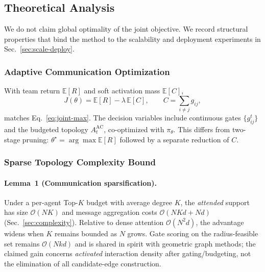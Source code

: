 
\subsection{Theoretical Analysis}
\label{sec:theory}

We do not claim global optimality of the joint objective.
We record structural properties that bind the method to the
scalability and deployment experiments in Sec.~\ref{sec:scale-deploy}.

\subsubsection{Adaptive Communication Optimization}
\label{sec:theory-obj}

With team return $\mathbb{E}[R]$ and soft activation mass $\mathbb{E}[C]$,
\begin{equation}
J(\theta)=\mathbb{E}[R]-\lambda\,\mathbb{E}[C],
\qquad
C=\sum_{i\neq j}g_{ij},
\label{eq:J}
\end{equation}
matches Eq.~\eqref{eq:joint-max}.
The decision variables include continuous gates $\{g_{ij}^{t}\}$ and the
budgeted topology $A_t^{\mathrm{AC}}$, co-optimized with $\pi_\theta$.
This differs from two-stage pruning:
$\theta^\star=\arg\max\mathbb{E}[R]$ followed by a separate reduction of $C$.

\subsubsection{Sparse Topology Complexity Bound}
\label{sec:theory-sparse}

\paragraph{Lemma~1 (Communication sparsification).}
Under a per-agent Top-$K$ budget with average degree $K$, the
\emph{attended} support has size $\mathcal{O}(NK)$ and message aggregation
costs $\mathcal{O}(NKd+Nd)$ (Sec.~\ref{sec:complexity}).
Relative to dense attention $\mathcal{O}(N^{2}d)$, the advantage widens when
$K$ remains bounded as $N$ grows.
Gate scoring on the radius-feasible set remains $\mathcal{O}(Nkd)$ and is
shared in spirit with geometric graph methods; the claimed gain concerns
\emph{activated} interaction density after gating/budgeting, not the elimination
of all candidate-edge construction.

